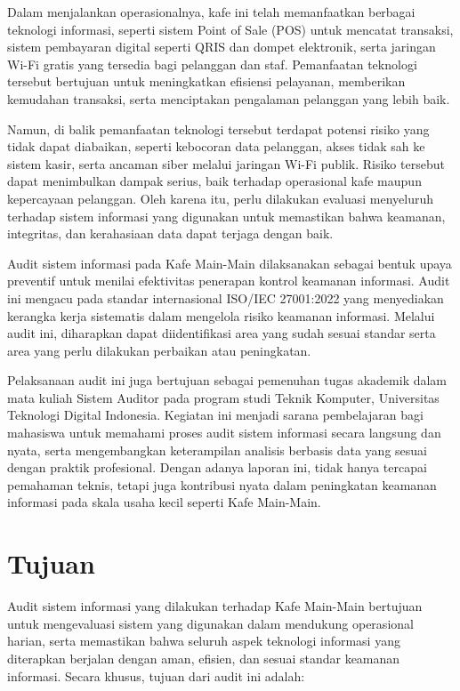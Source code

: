 \documentclass[12pt, a4paper]{report}
\begin{document}
Dalam menjalankan operasionalnya, kafe ini telah memanfaatkan berbagai teknologi informasi, seperti sistem Point of Sale (POS) untuk mencatat transaksi, sistem pembayaran digital seperti QRIS dan dompet elektronik, serta jaringan Wi-Fi gratis yang tersedia bagi pelanggan dan staf. Pemanfaatan teknologi tersebut bertujuan untuk meningkatkan efisiensi pelayanan, memberikan kemudahan transaksi, serta menciptakan pengalaman pelanggan yang lebih baik.

Namun, di balik pemanfaatan teknologi tersebut terdapat potensi risiko yang tidak dapat diabaikan, seperti kebocoran data pelanggan, akses tidak sah ke sistem kasir, serta ancaman siber melalui jaringan Wi-Fi publik. Risiko tersebut dapat menimbulkan dampak serius, baik terhadap operasional kafe maupun kepercayaan pelanggan. Oleh karena itu, perlu dilakukan evaluasi menyeluruh terhadap sistem informasi yang digunakan untuk memastikan bahwa keamanan, integritas, dan kerahasiaan data dapat terjaga dengan baik.

Audit sistem informasi pada Kafe Main-Main dilaksanakan sebagai bentuk upaya preventif untuk menilai efektivitas penerapan kontrol keamanan informasi. Audit ini mengacu pada standar internasional ISO/IEC 27001:2022 yang menyediakan kerangka kerja sistematis dalam mengelola risiko keamanan informasi. Melalui audit ini, diharapkan dapat diidentifikasi area yang sudah sesuai standar serta area yang perlu dilakukan perbaikan atau peningkatan.

Pelaksanaan audit ini juga bertujuan sebagai pemenuhan tugas akademik dalam mata kuliah Sistem Auditor pada program studi Teknik Komputer, Universitas Teknologi Digital Indonesia. Kegiatan ini menjadi sarana pembelajaran bagi mahasiswa untuk memahami proses audit sistem informasi secara langsung dan nyata, serta mengembangkan keterampilan analisis berbasis data yang sesuai dengan praktik profesional. Dengan adanya laporan ini, tidak hanya tercapai pemahaman teknis, tetapi juga kontribusi nyata dalam peningkatan keamanan informasi pada skala usaha kecil seperti Kafe Main-Main.



\section{Tujuan}

Audit sistem informasi yang dilakukan terhadap Kafe Main-Main bertujuan untuk mengevaluasi sistem yang digunakan dalam mendukung operasional harian, serta memastikan bahwa seluruh aspek teknologi informasi yang diterapkan berjalan dengan aman, efisien, dan sesuai standar keamanan informasi. Secara khusus, tujuan dari audit ini adalah:
\end{document}

